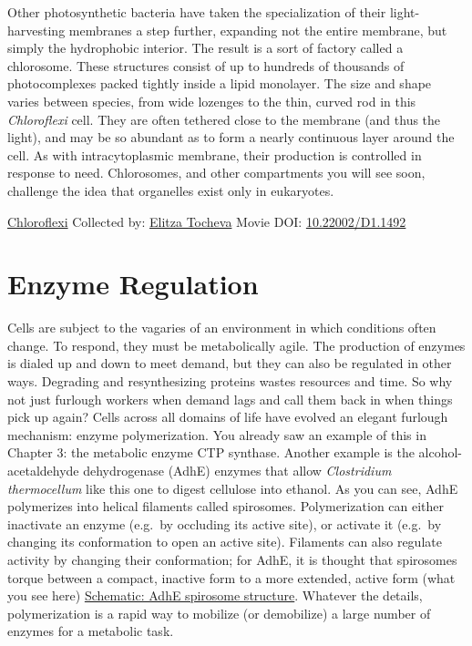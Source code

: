 \documentclass[]{tufte-book}
\begin{document}
Other photosynthetic bacteria have taken the specialization of their light-harvesting membranes a step further, expanding not the entire membrane, but simply the hydrophobic interior. The result is a sort of factory called a chlorosome. These structures consist of up to hundreds of thousands of photocomplexes packed tightly inside a lipid monolayer. The size and shape varies between species, from wide lozenges to the thin, curved rod in this \emph{Chloroflexi} cell. They are often tethered close to the membrane (and thus the light), and may be so abundant as to form a nearly continuous layer around the cell. As with intracytoplasmic membrane, their production is controlled in response to need. Chlorosomes, and other compartments you will see soon, challenge the idea that organelles exist only in eukaryotes.



\hypertarget{htmlwidget-51b7c1a5b906388c0ae9}{}

\label{fig:4-4}\protect\hyperlink{tree}{Chloroflexi} Collected by: \protect\hyperlink{elitza_tocheva}{Elitza Tocheva} Movie DOI: \href{https://doi.org/10.22002/D1.1492}{10.22002/D1.1492}

\hypertarget{enzyme-regulation}{%
\section{Enzyme Regulation}\label{enzyme-regulation}}

Cells are subject to the vagaries of an environment in which conditions often change. To respond, they must be metabolically agile. The production of enzymes is dialed up and down to meet demand, but they can also be regulated in other ways. Degrading and resynthesizing proteins wastes resources and time. So why not just furlough workers when demand lags and call them back in when things pick up again? Cells across all domains of life have evolved an elegant furlough mechanism: enzyme polymerization. You already saw an example of this in Chapter 3: the metabolic enzyme CTP synthase. Another example is the alcohol-acetaldehyde dehydrogenase (AdhE) enzymes that allow \emph{Clostridium thermocellum} like this one to digest cellulose into ethanol. As you can see, AdhE polymerizes into helical filaments called spirosomes. Polymerization can either inactivate an enzyme (e.g.~by occluding its active site), or activate it (e.g.~by changing its conformation to open an active site). Filaments can also regulate activity by changing their conformation; for AdhE, it is thought that spirosomes torque between a compact, inactive form to a more extended, active form (what you see here) \protect\hyperlink{AdhE_spirosome_structure}{Schematic: AdhE spirosome structure}. Whatever the details, polymerization is a rapid way to mobilize (or demobilize) a large number of enzymes for a metabolic task.
\end{document}
